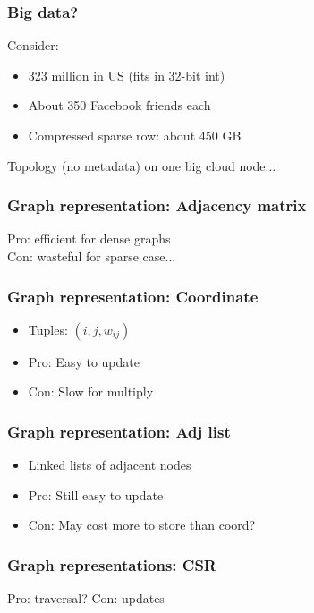 \documentclass{beamer}
\begin{document}
\begin{frame}
  \frametitle{Big data?}

  Consider:
  \begin{itemize}
  \item 323 million in US (fits in 32-bit int)
  \item About 350 Facebook friends each
  \item Compressed sparse row: about 450 GB
  \end{itemize}
  Topology (no metadata) on one big cloud node...
\end{frame}

\begin{frame}
  \frametitle{Graph representation: Adjacency matrix}

  \begin{center}
    \begin{tikzpicture}
      
    \end{tikzpicture}

    Pro: efficient for dense graphs \\
    Con: wasteful for sparse case...
  \end{center}
\end{frame}

\begin{frame}
  \frametitle{Graph representation: Coordinate}

  \begin{itemize}
  \item Tuples: $(i,j,w_{ij})$
  \item Pro: Easy to update
  \item Con: Slow for multiply
  \end{itemize}
\end{frame}

\begin{frame}
  \frametitle{Graph representation: Adj list}

  \begin{itemize}
  \item Linked lists of adjacent nodes
  \item Pro: Still easy to update
  \item Con: May cost more to store than coord?
  \end{itemize}
\end{frame}

\begin{frame}
  \frametitle{Graph representations: CSR}
  
  \begin{center}
    

    Pro: traversal?  Con: updates
  \end{center}  
\end{frame}
\end{document}
